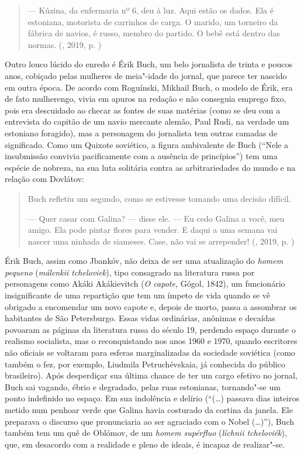 \begin{quotation}
--- Kúzina, da enfermaria nº 6, deu à luz. Aqui estão os dados. Ela é
estoniana, motorista de carrinhos de carga. O marido, um torneiro da
fábrica de navios, é russo, membro do partido. O bebê está dentro das
normas. 
{}(, 2019, p. \pageref{ref4})
\end{quotation}

Outro louco lúcido do enredo é Érik Buch, um belo jornalista de trinta e
poucos anos, cobiçado pelas mulheres de meia"-idade do jornal, que parece
ter nascido em outra época. De acordo com Roguínski, Mikhail Buch, o
modelo de Érik, era de fato mulherengo, vivia em apuros na redação e não
conseguia emprego fixo, pois era descuidado ao checar as fontes de suas
matérias (como se deu com a entrevista do capitão de um navio mercante
alemão, Paul Rudi, na verdade um estoniano foragido), mas a personagem
do jornalista tem outras camadas de significado. Como um Quixote
soviético, a figura ambivalente de Buch (``Nele a insubmissão convivia
pacificamente com a ausência de princípios'') tem uma espécie de
nobreza, na sua luta solitária contra as arbitrariedades do mundo e na
relação com Dovlátov:

\begin{quotation}
Buch refletiu um segundo, como se estivesse tomando uma decisão difícil.

--- Quer casar com Galina? --- disse ele. --- Eu cedo Galina a você, meu
amigo. Ela pode pintar flores para vender. E daqui a uma semana vai
nascer uma ninhada de siameses. Case, não vai se arrepender! 
{}(, 2019, p. \pageref{ref5})
\end{quotation}

Érik Buch, assim como Jbankóv, não deixa de ser uma atualização do
\emph{homem pequeno} (\emph{málenkii tcheloviek}), tipo consagrado na
literatura russa por personagens como Akáki Akákievitch (\emph{O
capote,} Gógol, 1842), um funcionário insignificante de uma
repartição que tem um ímpeto de vida quando se vê obrigado a encomendar
um novo capote e, depois de morto, passa a assombrar os habitantes de
São Petersburgo. Essas vidas ordinárias, anônimas e decaídas povoaram as
páginas da literatura russa do século 19, perdendo espaço durante o
realismo socialista, mas o reconquistando nos anos 1960 e 1970, quando
escritores não oficiais se voltaram para esferas marginalizadas da
sociedade soviética (como também o fez, por exemplo, Liudmila
Petruchévskaia, já conhecida do público brasileiro). Após desperdiçar
sua última chance de ter um cargo efetivo no jornal, Buch sai vagando,
ébrio e degradado, pelas ruas estonianas, tornando"-se um ponto
indefinido no espaço. Em sua indolência e delírio (``(\ldots{}) passava dias
inteiros metido num penhoar verde que Galina havia costurado da cortina
da janela. Ele preparava o discurso que pronunciaria ao ser agraciado
com o Nobel (\ldots{})''), Buch também tem um quê de Oblómov, de um
\emph{homem supérfluo} (\emph{líchnii tcheloviék}), que, em desacordo
com a realidade e pleno de ideais, é incapaz de realizar"-se.

